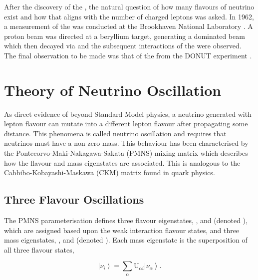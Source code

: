 After the discovery of the , the natural question of how many flavours of neutrino exist and how that aligns with the number of charged leptons was asked. In 1962, a measurement of the \quickmath{\nu_{\mu}} was conducted at the Brookhaven National Laboratory \cite{Lederman}. A proton beam was directed at a beryllium target, generating a \quickmath{\pi} dominated beam which then decayed via \quickmath{\pi^{+} \rightarrow \mu^{+} + \nu_{\mu}} and the subsequent interactions of the \quickmath{\nu_{\mu}} were observed. The final observation to be made was that of the \quickmath{\nu_{\tau}} from the DONUT experiment \cite{tau_nu_disc}.

\section{Theory of Neutrino Oscillation}
\label{sec:NeutrinoOscillationPhysics_EvidenceForNeutrinoOscillation}

As direct evidence of beyond Standard Model physics, a neutrino generated with lepton flavour \quickmath{\alpha} can mutate into a different lepton flavour \quickmath{\beta} after propagating some distance. This phenomena is called neutrino oscillation and requires that neutrinos must have a non-zero mass. This behaviour has been characterised by the Pontecorvo-Maki-Nakagawa-Sakata (PMNS) \cite{p1,p2,km} mixing matrix which describes how the flavour and mass eigenstates are associated. This is analogous to the Cabbibo-Kobayashi-Maskawa (CKM) \cite{cabbibo} matrix found in quark physics.

\subsection{Three Flavour Oscillations}

The PMNS parameterisation defines three flavour eigenstates, , \quickmath{\nu_{\mu}} and \quickmath{\nu_{\tau}} (denoted \quickmath{\nu_{\alpha}}), which are assigned based upon the weak interaction flavour states, and three mass eigenstates, ,  and  (denoted ). Each mass eigenstate is the superposition of all three flavour states,

\begin{equation}
  \label{eq:NeutrinoOscillationPhysics_Superposition}
  \left|\nu_{i}\right> = \sum_{\alpha}\mathrm{U}_{\alpha i}\left|\nu_{\alpha}\right>.
\end{equation}

